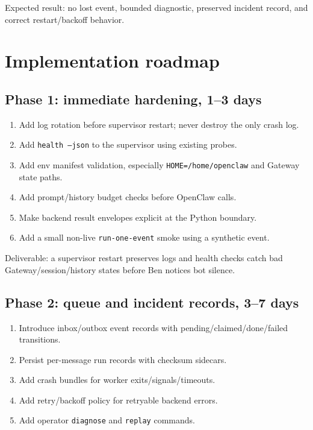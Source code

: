 \documentclass[11pt]{article}
\begin{document}
Expected result: no lost event, bounded diagnostic, preserved incident record, and correct restart/backoff behavior.

\section{Implementation roadmap}

\subsection{Phase 1: immediate hardening, 1--3 days}

\begin{enumerate}
  \item Add log rotation before supervisor restart; never destroy the only crash log.
  \item Add \texttt{health --json} to the supervisor using existing probes.
  \item Add env manifest validation, especially \texttt{HOME=/home/openclaw} and Gateway state paths.
  \item Add prompt/history budget checks before OpenClaw calls.
  \item Make backend result envelopes explicit at the Python boundary.
  \item Add a small non-live \texttt{run-one-event} smoke using a synthetic event.
\end{enumerate}

Deliverable: a supervisor restart preserves logs and health checks catch bad Gateway/session/history states before Ben notices bot silence.

\subsection{Phase 2: queue and incident records, 3--7 days}

\begin{enumerate}
  \item Introduce inbox/outbox event records with pending/claimed/done/failed transitions.
  \item Persist per-message run records with checksum sidecars.
  \item Add crash bundles for worker exits/signals/timeouts.
  \item Add retry/backoff policy for retryable backend errors.
  \item Add operator \texttt{diagnose} and \texttt{replay} commands.
\end{enumerate}
\end{document}
